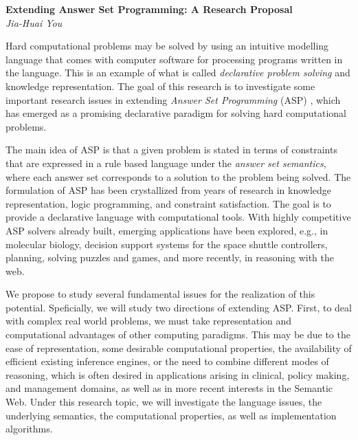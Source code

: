 \documentclass[12pt]{article}
\begin{document}
\begin{center}
{\bf \Large Extending Answer Set Programming: A Research Proposal}  \\
\vspace{.1in}
{\em Jia-Huai You}
\end{center}


Hard computational problems may be solved by using an intuitive modelling language that comes with computer software for processing programs written in the language. This is an example of what is called {\em declarative problem solving} and knowledge representation. The goal of this research is to investigate some important research issues in extending {\em Answer Set Programming} (ASP)  \cite{gelfond,Lifschitz:AAAI2008}, which has emerged as a promising declarative paradigm for solving hard computational problems.

\vspace{.1in}
The main idea of ASP is that a given problem is stated in terms of constraints that are expressed in a rule based
language under the {\em answer set semantics}, where each answer set corresponds to a solution to the problem being solved. The formulation of ASP has been crystallized from years of research in knowledge representation, logic programming, and constraint satisfaction. The goal is to provide a declarative language with computational tools. With highly competitive ASP solvers already built, emerging applications have been explored, e.g., in molecular biology, decision support systems for the space shuttle controllers, planning, solving puzzles and games, and more recently, in reasoning with the web. 

\vspace{.1in}
We propose to study several fundamental issues for the realization of this potential. Speficially, we will study two directions of extending ASP. 
First, to deal with complex real world problems, we must take representation and computational advantages of other computing
paradigms. This may be due to the ease of representation, some desirable computational properties, the availability of efficient existing inference engines, or the need to combine different modes of reasoning, which is often desired in applications arising in clinical, policy making, and management domains, as well as in more recent interests in the Semantic Web. Under this research topic, we will investigate the language issues, the underlying semantics, the computational properties, as well as implementation algorithms.
\end{document}
